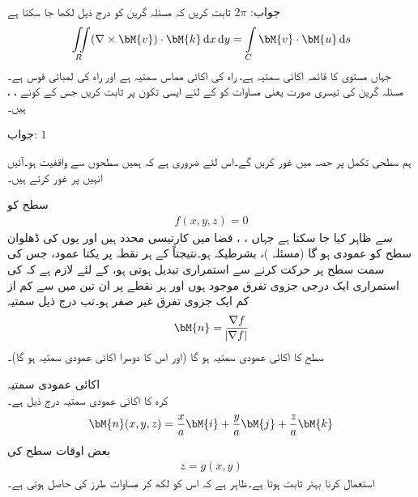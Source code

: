 جواب:\quad
$2\pi$
ثابت کریں کہ مسئلہ گرین کو درج ذیل لکھا جا سکتا ہے
\begin{align}\label{مساوات_خطی_تکمل_مسئلہ_گرین_تیسری_صورت}
\iint\limits_R (\nabla \times \bM{v}) \cdot \bM{k}\dif x\dif y=\int\limits_C \bM{v}\cdot \bM{u}\dif s
\end{align}
جہاں  مستوی  کا قائمہ اکائی سمتیہ ہے،  راہ  کی اکائی مماس سمتیہ ہے اور  راہ  کی لمبائی قوس ہے۔
مسئلہ گرین کی تیسری صورت یعنی مساوات  کو  کے لئے ایسی تکون پر ثابت کریں جس کے کونے ، ،  ہیں۔

جواب:\quad
$1$

ہم سطحی تکمل پر حصہ  میں غور کریں گے۔اس لئے ضروری ہے کہ ہمیں سطحوں سے واقفیت ہو۔آئیں انہیں پر غور کرتے ہیں۔

سطح  کو 
\begin{align}\label{مساوات_خطی_تکمل_سطح_خفی_روپ}
f(x,y,z)=0
\end{align}
سے ظاہر کیا جا سکتا ہے جہاں ، ،  فضا میں کارتیسی محدد ہیں اور یوں  کی ڈھلوان سطح  کو عمودی ہو گا (مسئلہ )، بشرطیکہ  ہو۔نتیجتاً  کے ہر نقطہ پر یکتا عمود، جس کی سمت سطح پر حرکت کرنے سے استمراری تبدیل ہوتی ہو، کے لئے لازم ہے کہ  کی استمراری ایک درجی جزوی تفرق موجود ہوں اور ہر نقطے پر ان تین میں سے کم از کم ایک جزوی تفرق غیر صفر ہو۔تب درج ذیل سمتیہ
\begin{align}
\bM{n}=\frac{\nabla f}{\abs{\nabla f}}
\end{align}
سطح  کا اکائی عمودی سمتیہ ہو گا (اور  اس کا دوسرا اکائی عمودی سمتیہ ہو گا)۔

\quad اکائی عمودی سمتیہ\\
کرہ  کا اکائی عمودی سمتیہ درج ذیل ہے۔
\begin{align*}
\bM{n}(x,y,z)=\frac{x}{a}\bM{i}+\frac{y}{a}\bM{j}+\frac{z}{a}\bM{k}
\end{align*}
بعض اوقات سطح کی 
\begin{align}\label{مساوات_خطی_تکمل_سطح_صریح_روپ}
z=g(x,y)
\end{align}
استعمال کرنا بہتر ثابت ہوتا ہے۔ظاہر ہے کہ اس کو  لکھ کر  مساوات  طرز  کی  حاصل ہوتی ہے۔

